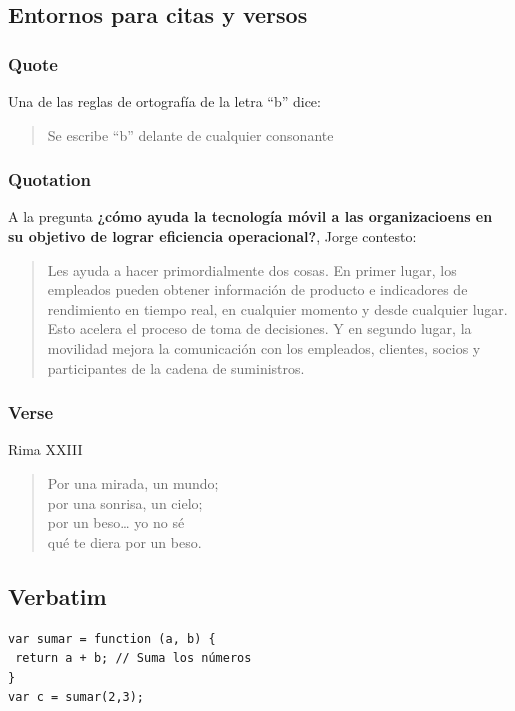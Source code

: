 \documentclass[11pt,twoside,a4paper]{article}
\begin{document}
\subsection{Entornos para citas y versos}
\label{sec:entornoscitasyversos}

\subsubsection{Quote}
\label{sec:quote}

Una de las reglas de ortografía de la letra ``b'' dice:
\begin{quote}
  Se escribe ``b'' delante de cualquier consonante
\end{quote}

\subsubsection{Quotation}
\label{sec:quotation}

A la pregunta \textbf{¿cómo ayuda la tecnología móvil a las organizacioens en su objetivo de lograr eficiencia operacional?}, Jorge contesto:
\begin{quotation}
  Les ayuda a hacer primordialmente dos cosas.
En primer lugar, los empleados pueden obtener información de producto e indicadores de rendimiento en tiempo real, en cualquier momento y desde cualquier lugar. Esto acelera el proceso de toma de decisiones.
Y en segundo lugar, la movilidad mejora la comunicación con los empleados, clientes, socios y participantes de la cadena de suministros.
\end{quotation}

\subsubsection{Verse}
\label{sec:verse}

\large Rima XXIII
\normalsize
\begin{verse}
  Por una mirada, un mundo;\\
  por una sonrisa, un cielo;\\
  por un beso\ldots{} yo no sé\\
  qué te diera por un beso.
\end{verse}

\subsection{Verbatim}
\label{sec:verbatim}
\scriptsize
\begin{verbatim}
var sumar = function (a, b) {
 return a + b; // Suma los números
}
var c = sumar(2,3);
\end{verbatim}
\normalsize
\end{document}

